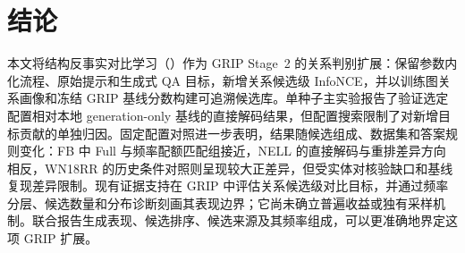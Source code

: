 \section{结论}

本文将结构反事实对比学习（\scc）作为 GRIP Stage~2 的关系判别扩展：保留参数内化流程、原始提示和生成式 QA 目标，新增关系候选级 InfoNCE，并以训练图关系画像和冻结 GRIP 基线分数构建可追溯候选库。单种子主实验报告了验证选定配置相对本地 generation-only 基线的直接解码结果，但配置搜索限制了对新增目标贡献的单独归因。固定配置对照进一步表明，结果随候选组成、数据集和答案规则变化：FB 中 Full 与频率配额匹配组接近，NELL 的直接解码与重排差异方向相反，WN18RR 的历史条件对照则呈现较大正差异，但受实体对核验缺口和基线复现差异限制。现有证据支持在 GRIP 中评估关系候选级对比目标，并通过频率分层、候选数量和分布诊断刻画其表现边界；它尚未确立普遍收益或独有采样机制。联合报告生成表现、候选排序、候选来源及其频率组成，可以更准确地界定这项 GRIP 扩展。
